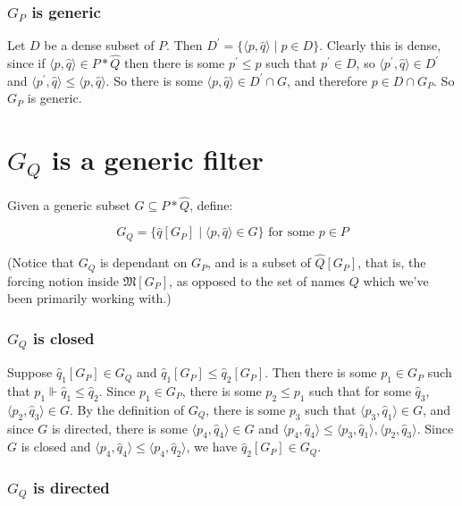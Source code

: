 \documentclass[12pt]{article}
\begin{document}
\subsubsection*{$G_P$ is generic}

Let $D$ be a dense subset of $P$.  Then $D^\prime=\{\langle p,\hat{q}\rangle\mid p\in D\}$.  Clearly this is dense, since if $\langle p,\hat{q}\rangle\in P*\hat{Q}$ then there is some $p^\prime\leq p$ such that $p^\prime\in D$, so $\langle p^\prime, \hat{q}\rangle\in D^\prime$ and $\langle p^\prime,\hat{q}\rangle\leq\langle p,\hat{q}\rangle$.  So there is some $\langle p,\hat{q}\rangle\in D^\prime\cap G$, and therefore $p\in D\cap G_P$.  So $G_P$ is generic.

\section*{$G_Q$ is a generic filter}

Given a generic subset $G\subseteq P*\hat{Q}$, define:

$$G_Q=\{\hat{q}[G_P]\mid \langle p,\hat{q}\rangle\in G\} \text{ for some }p\in P$$

(Notice that $G_Q$ is dependant on $G_P$, and is a subset of $\hat{Q}[G_P]$, that is, the forcing notion inside $\mathfrak{M}[G_P]$, as opposed to the set of names $Q$ which we've been primarily working with.)

\subsubsection*{$G_Q$ is closed}

Suppose $\hat{q}_1[G_P]\in G_Q$ and $\hat{q}_1[G_P]\leq\hat{q}_2[G_P]$.  Then there is some $p_1\in G_P$ such that $p_1\Vdash\hat{q}_1\leq\hat{q}_2$.  Since $p_1\in G_P$, there is some $p_2\leq p_1$ such that for some $\hat{q}_3$, $\langle p_2,\hat{q}_3\rangle\in G$.  By the definition of $G_Q$, there is some $p_3$ such that $\langle p_3,\hat{q}_1\rangle\in G$, and since $G$ is directed, there is some $\langle p_4,\hat{q}_4\rangle\in G$ and $\langle p_4,\hat{q}_4\rangle\leq \langle p_3,\hat{q}_1\rangle,\langle p_2,\hat{q}_3\rangle$.  Since $G$ is closed and $\langle p_4,\hat{q}_4\rangle\leq\langle p_4,\hat{q}_2\rangle$, we have $\hat{q}_2[G_P]\in G_Q$.

\subsubsection*{$G_Q$ is directed}
\end{document}
